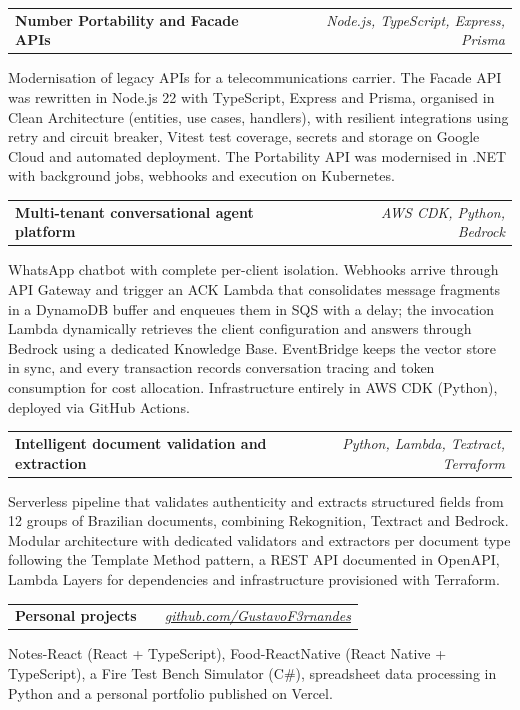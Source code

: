 \documentclass[a4paper,11pt]{article}
\makeatletter
\newenvironment{jobshort}[2]
    {
    \begin{tabularx}{\linewidth}{@{}l X r@{}}
    \textbf{#1} & \hfill &  #2 \\[3.75pt]
    \end{tabularx}
    }
    {
    }
\makeatother
\begin{document}
\begin{jobshort}{Number Portability and Facade APIs}{\textit{Node.js, TypeScript, Express, Prisma}}
Modernisation of legacy APIs for a telecommunications carrier. The Facade API was rewritten in Node.js 22 with TypeScript, Express and Prisma, organised in Clean Architecture (entities, use cases, handlers), with resilient integrations using retry and circuit breaker, Vitest test coverage, secrets and storage on Google Cloud and automated deployment. The Portability API was modernised in .NET with background jobs, webhooks and execution on Kubernetes.
\end{jobshort}

\begin{jobshort}{Multi-tenant conversational agent platform}{\textit{AWS CDK, Python, Bedrock}}
WhatsApp chatbot with complete per-client isolation. Webhooks arrive through API Gateway and trigger an ACK Lambda that consolidates message fragments in a DynamoDB buffer and enqueues them in SQS with a delay; the invocation Lambda dynamically retrieves the client configuration and answers through Bedrock using a dedicated Knowledge Base. EventBridge keeps the vector store in sync, and every transaction records conversation tracing and token consumption for cost allocation. Infrastructure entirely in AWS CDK (Python), deployed via GitHub Actions.
\end{jobshort}

\begin{jobshort}{Intelligent document validation and extraction}{\textit{Python, Lambda, Textract, Terraform}}
Serverless pipeline that validates authenticity and extracts structured fields from 12 groups of Brazilian documents, combining Rekognition, Textract and Bedrock. Modular architecture with dedicated validators and extractors per document type following the Template Method pattern, a REST API documented in OpenAPI, Lambda Layers for dependencies and infrastructure provisioned with Terraform.
\end{jobshort}

\begin{jobshort}{Personal projects}{\href{https://github.com/GustavoF3rnandes}{\textit{github.com/GustavoF3rnandes}}}
Notes-React (React + TypeScript), Food-ReactNative (React Native + TypeScript), a Fire Test Bench Simulator (C\#), spreadsheet data processing in Python and a personal portfolio published on Vercel.
\end{jobshort}

\end{document}
